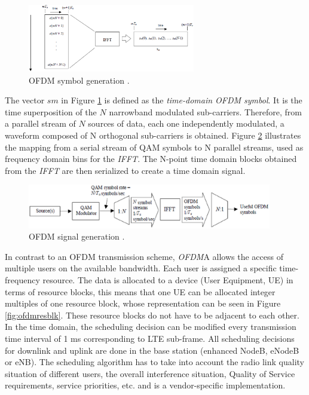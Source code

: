 \begin{figure}[htbp]
    \centering
    \includegraphics[width=0.65\textwidth]{./figures/ofdm_symbol_gen}
    \caption{ OFDM symbol generation \cite{umtslte}.
    \label{fig:ofdmsymbol}}
\end{figure}

The vector $sm$ in Figure \ref{fig:ofdmsymbol} is defined as the
\emph{time-domain OFDM symbol}. It is the time superposition of the $N$
narrowband modulated sub-carriers. Therefore, from a parallel stream of $N$
sources of data, each one independently modulated, a waveform composed of N
orthogonal sub-carriers is obtained. Figure \ref{fig:ofdmchain} illustrates the
mapping from a serial stream of QAM symbols to N parallel streams, used as
frequency domain bins for the \textit{IFFT}. The N-point time domain blocks
obtained from the \textit{IFFT} are then serialized to create a time domain
signal.

\begin{figure}[htbp]
    \centering
    \includegraphics[width=0.95\textwidth]{./figures/ofdm_signal_chain}
    \caption{ OFDM signal generation \cite{umtslte}.
    \label{fig:ofdmchain}}
\end{figure}

In contrast to an OFDM transmission scheme, \textit{OFDM}A allows the access of
multiple users on the available bandwidth. Each user is assigned a specific
time-frequency resource. The data is allocated to a device (User Equipment, UE)
in terms of resource blocks, this means that one UE can be allocated integer
multiples of one resource block, whose representation can be seen in Figure
\ref{fig:ofdmresblk}. These resource blocks do not have to be adjacent to each
other. In the time domain, the scheduling decision can be modified every
transmission time interval of 1 ms corresponding to LTE sub-frame. All scheduling
decisions for downlink and uplink are done in the base station (enhanced NodeB,
eNodeB or eNB). The scheduling algorithm has to take into account the radio link
quality situation of different users, the overall interference situation,
Quality of Service requirements, service priorities, etc. and is a
vendor-specific implementation.

